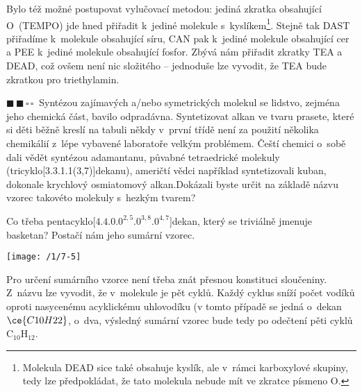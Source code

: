 \documentclass{book}
\newcommand{\dva}{$\blacksquare \, \blacksquare \, \square \, \square \; \; $}
\renewenvironment{quotation}{\par}{\par} %
\begin{document}
Bylo též možné postupovat vylučovací metodou: jediná zkratka obsahující O~(TEMPO) jde hned přiřadit k~jediné molekule s~kyslíkem\footnote{Molekula DEAD sice také obsahuje kyslík, ale v~rámci karboxylové skupiny, tedy lze předpokládat, že tato molekula nebude mít ve zkratce písmeno O.}. Stejně tak DAST přiřadíme k~molekule obsahující síru, CAN pak k~jediné molekule obsahující cer a PEE k~jediné molekule obsahující fosfor. Zbývá nám přiřadit zkratky TEA a DEAD, což ovšem není nic složitého -- jednoduše lze vyvodit, že TEA bude zkratkou pro triethylamin.

\hrulefill %
\begin{quotation}
\dva Syntézou zajímavých a/nebo symetrických molekul se lidstvo, zejména
jeho chemická část, bavilo odpradávna. Syntetizovat alkan ve tvaru
prasete, které si děti běžně kreslí na tabuli někdy v~první třídě
není za použití několika chemikálií z~lépe vybavené laboratoře velkým
problémem. Čeští chemici o~sobě dali vědět syntézou adamantanu, půvabné
tetraedrické molekuly (tricyk\-lo{[}3.3.1.1(3,7){]}de\-ka\-nu), američtí
vědci například syntetizovali kuban, dokonale krychlový osmiatomový
alkan.Dokázali byste určit na základě názvu vzorec takovéto molekuly s~hezkým tvarem? 

Co třeba pen\-ta\-cyk\-lo{[}$4.4.0.0^{2,5}.0^{3,8}.0^{4,7}${]}de\-kan, který se triviálně jmenuje basketan?
Postačí nám jeho sumární vzorec.
\end{quotation} \dotfill \par 
\begin{center}
\texttt{[image: /1/7-5]}
\end{center}


Pro určení sumárního vzorce není třeba znát přesnou konstituci sloučeniny. Z~názvu lze vyvodit, že v~molekule je pět cyklů. Každý cyklus sníží počet vodíků oproti nasycenému acyklickému uhlovodíku (v tomto případě se jedná o~dekan $\ce{C10H22}$, o~dva, výsledný sumární vzorec bude tedy po odečtení pěti cyklů $\mathrm{C_{10}H_{12}}$.
\end{document}
